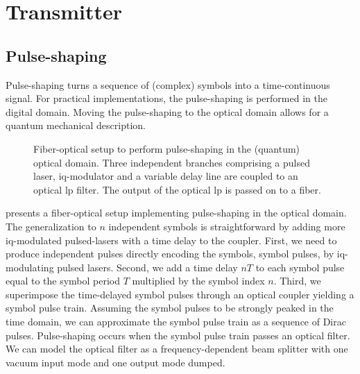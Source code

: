 \section{Transmitter}


\subsection{Pulse-shaping}

Pulse-shaping turns a sequence of (complex) symbols into a time-continuous signal.
For practical implementations, the pulse-shaping is performed in the digital domain.
Moving the pulse-shaping to the optical domain allows for a quantum mechanical description.

\begin{figure}[htb]
	\centering
    
    \caption{Fiber-optical setup to perform pulse-shaping in the (quantum) optical domain. Three independent branches comprising a pulsed laser, \gls{iq}-modulator and a variable delay line are coupled to an optical \gls{lp} filter. The output of the optical \gls{lp} is passed on to a fiber.}\label{fig:quantum_pulse_shaping}
\end{figure}
 presents a fiber-optical setup implementing pulse-shaping in the optical domain.
The generalization to $n$ independent symbols is straightforward by adding more \gls{iq}-modulated pulsed-lasers with a time delay to the coupler.
First, we need to produce independent pulses directly encoding the symbols, symbol pulses, by \gls{iq}-modulating pulsed lasers.
Second, we add a time delay $nT$ to each symbol pulse equal to the symbol period $T$ multiplied by the symbol index $n$.
Third, we superimpose the time-delayed symbol pulses through an optical coupler yielding a symbol pulse train.
Assuming the symbol pulses to be strongly peaked in the time domain, we can approximate the symbol pulse train as a sequence of Dirac pulses.
Pulse-shaping occurs when the symbol pulse train passes an optical filter.
We can model the optical filter as a frequency-dependent beam splitter with one vacuum input mode and one output mode dumped.

